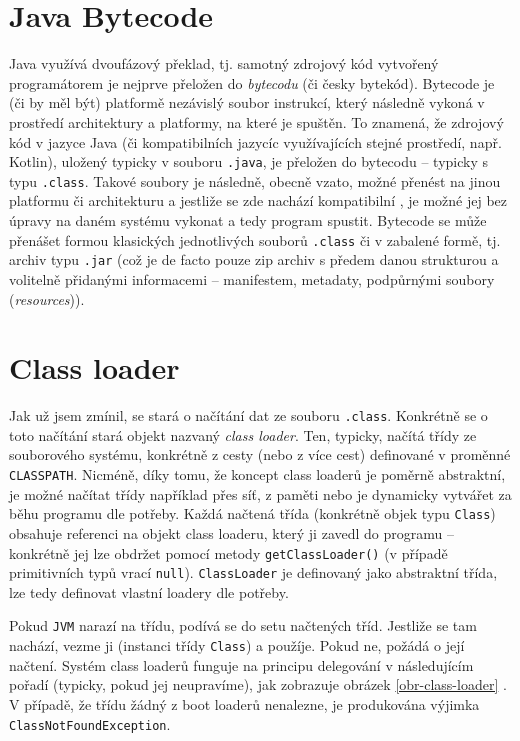 \section{Java Bytecode}
Java využívá dvoufázový překlad, tj. samotný zdrojový kód vytvořený programátorem je nejprve přeložen do \textit{bytecodu} (či česky bytekód). Bytecode je (či by měl být) platformě nezávislý soubor instrukcí, který následně  vykoná v prostředí architektury a platformy, na které je spuštěn. To znamená, že zdrojový kód v jazyce Java (či kompatibilních jazycíc využívajících stejné prostředí, např. Kotlin), uložený typicky v souboru \texttt{.java}, je přeložen do bytecodu -- typicky s typu \texttt{.class}. Takové soubory je následně, obecně vzato, možné přenést na jinou platformu či architekturu a jestliže se zde nachází kompatibilní , je možné jej bez úpravy na daném systému vykonat a tedy program spustit. Bytecode se může přenášet formou klasických jednotlivých souborů \texttt{.class} či v zabalené formě, tj. archiv typu \texttt{.jar} (což je de facto pouze zip archiv s předem danou strukturou a volitelně přidanými informacemi -- manifestem, metadaty, podpůrnými soubory (\textit{resources})).

\section{Class loader}
Jak už jsem zmínil,  se stará o načítání dat ze souboru \texttt{.class}. Konkrétně se o toto načítání stará objekt nazvaný \textit{class loader}. Ten, typicky, načítá třídy ze souborového systému, konkrétně z cesty (nebo z více cest) definované v proměnné \texttt{CLASSPATH}. Nicméně, díky tomu, že koncept class loaderů je poměrně abstraktní, je možné načítat třídy například přes síť, z paměti nebo je dynamicky vytvářet za běhu programu dle potřeby. Každá načtená třída (konkrétně objek typu \texttt{Class}) obsahuje referenci na objekt class loaderu, který ji zavedl do programu -- konkrétně jej lze obdržet pomocí metody \texttt{getClassLoader()} (v případě primitivních typů vrací \texttt{null}). \texttt{ClassLoader} je definovaný jako abstraktní třída, lze tedy definovat vlastní loadery dle potřeby. 

Pokud \texttt{JVM} narazí na třídu, podívá se do setu načtených tříd. Jestliže se tam nachází, vezme ji (instanci třídy \texttt{Class}) a použíje. Pokud ne, požádá o její načtení. Systém class loaderů funguje na principu delegování v následujícím pořadí (typicky, pokud jej neupravíme), jak zobrazuje obrázek \ref{obr-class-loader} \cite{class-loader} \cite{class-loader-hierarchy}. V případě, že třídu žádný z boot loaderů nenalezne, je produkována výjimka \texttt{ClassNotFoundException}. 


